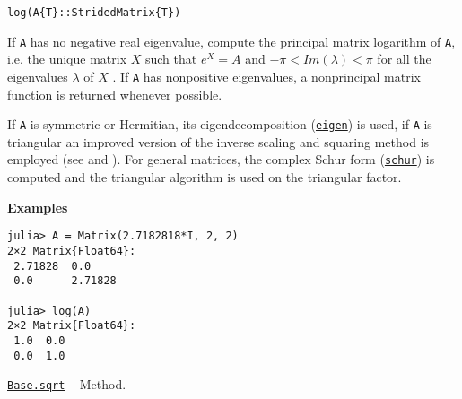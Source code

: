 \begin{adjustwidth}{2em}{0pt}


\begin{verbatim}
log(A{T}::StridedMatrix{T})
\end{verbatim}

If \texttt{A} has no negative real eigenvalue, compute the principal matrix logarithm of \texttt{A}, i.e. the unique matrix  \(X\)  such that  \(e^X = A\)  and  \(-\pi < Im(\lambda) < \pi\)  for all the eigenvalues  \(\lambda\)  of  \(X\) . If \texttt{A} has nonpositive eigenvalues, a nonprincipal matrix function is returned whenever possible.

If \texttt{A} is symmetric or Hermitian, its eigendecomposition (\hyperlink{11056016707394839114}{\texttt{eigen}}) is used, if \texttt{A} is triangular an improved version of the inverse scaling and squaring method is employed (see \footnotemark[9] and \footnotemark[10]). For general matrices, the complex Schur form (\hyperlink{17132870828407138368}{\texttt{schur}}) is computed and the triangular algorithm is used on the triangular factor.

\textbf{Examples}


\begin{verbatim}
julia> A = Matrix(2.7182818*I, 2, 2)
2×2 Matrix{Float64}:
 2.71828  0.0
 0.0      2.71828

julia> log(A)
2×2 Matrix{Float64}:
 1.0  0.0
 0.0  1.0
\end{verbatim}



\end{adjustwidth}
\hypertarget{1603188355614575969}{}
\hyperlink{1603188355614575969}{\texttt{Base.sqrt}}  -- {Method.}

